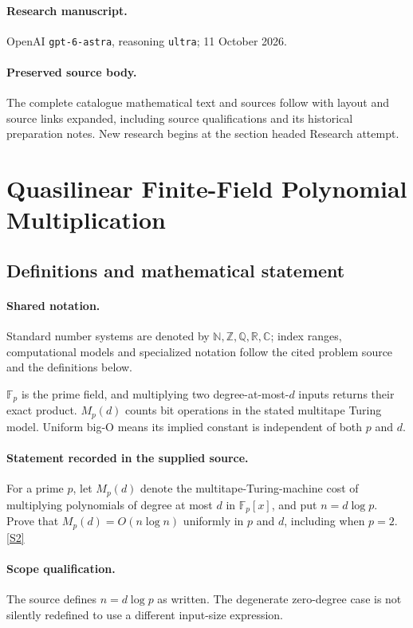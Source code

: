 \documentclass[11pt]{article}
\begin{document}
\paragraph{Research manuscript.} OpenAI \texttt{gpt-6-astra}, reasoning \texttt{ultra}; 11 October 2026.
\paragraph{Preserved source body.} The complete catalogue mathematical text and sources follow with layout and source links expanded, including source qualifications and its historical preparation notes. New research begins at the section headed Research attempt.

\section{Quasilinear Finite-Field Polynomial Multiplication}\label{statement}

\subsection{Definitions and mathematical statement}

\paragraph{Shared notation.}Standard number systems are denoted by $\mathbb N,\mathbb Z,\mathbb Q,\mathbb R,\mathbb C$; index ranges, computational models and specialized notation follow the cited problem source and the definitions below.


$\mathbb F_p$ is the prime field, and multiplying two degree-at-most-$d$ inputs returns their exact product. $M_p(d)$ counts bit operations in the stated multitape Turing model. Uniform big-O means its implied constant is independent of both $p$ and $d$.
\paragraph{Statement recorded in the supplied source.}
For a prime $p$, let $M_p(d)$ denote the multitape-Turing-machine cost of multiplying polynomials of degree at most $d$ in $\mathbb{F}_p[x]$, and put $n=d\log p$. Prove that $M_p(d)=O(n\log n)$ uniformly in $p$ and $d$, including when $p=2$. \href{https://doi.org/10.4171/owr/2024/40}{[S2]}
\paragraph{Scope qualification.}
The source defines $n=d\log p$ as written. The degenerate zero-degree case is not silently redefined to use a different input-size expression.
\end{document}
